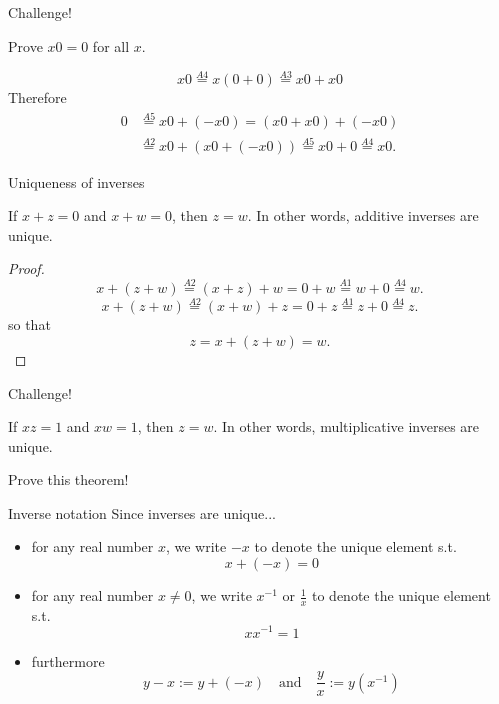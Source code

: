 \documentclass{beamer}
\begin{document}
\begin{frame}{Challenge!}
\begin{prob}
Prove $x0 = 0$ for all $x$.
\end{prob}
\pause
\begin{soln}
$$x0 \stackrel{A4}{=} x(0+0) \stackrel{A3}{=} x0+x0$$
\pause
Therefore
\begin{align*}
0 &\stackrel{A5}{=} x0+(-x0) = (x0+x0)+(-x0)\\
  & \stackrel{A2}{=} x0+(x0+(-x0)) \stackrel{A5}{=} x0+0 \stackrel{A4}{=} x0.
\end{align*}
\end{soln}
\end{frame}

\begin{frame}{Uniqueness of inverses}
\begin{thm}
If $x+z=0$ and $x+w=0$, then $z=w$.
In other words, additive inverses are unique.
\end{thm}
\pause
\begin{proof}
$$x+(z+w) \stackrel{A2}{=} (x+z)+w = 0+w \stackrel{A1}{=} w+0 \stackrel{A4}{=} w.$$
\pause
$$x+(z+w) \stackrel{A2}{=} (x+w)+z = 0+z \stackrel{A1}{=} z+0  \stackrel{A4}{=} z.$$
so that
$$z = x+(z+w) = w.$$
\end{proof}
\end{frame}

\begin{frame}{Challenge!}
\begin{thm}
If $xz=1$ and $xw=1$, then $z=w$.
In other words, multiplicative inverses are unique.
\end{thm}
\pause
\begin{prob}
Prove this theorem!
\end{prob}
\end{frame}

\begin{frame}{Inverse notation}
Since inverses are unique...
\begin{itemize}
\item for any real number $x$, we write $-x$ to denote the unique element s.t.
$$x + (-x) = 0$$
\item for any real number $x\neq0$, we write $x^{-1}$ or $\frac{1}{x}$ to denote the unique element s.t.
$$xx^{-1} = 1$$
\item furthermore
$$y-x := y + (-x)\quad\text{and}\quad \frac{y}{x} := y(x^{-1})$$
\end{itemize}
\end{frame}
\end{document}
